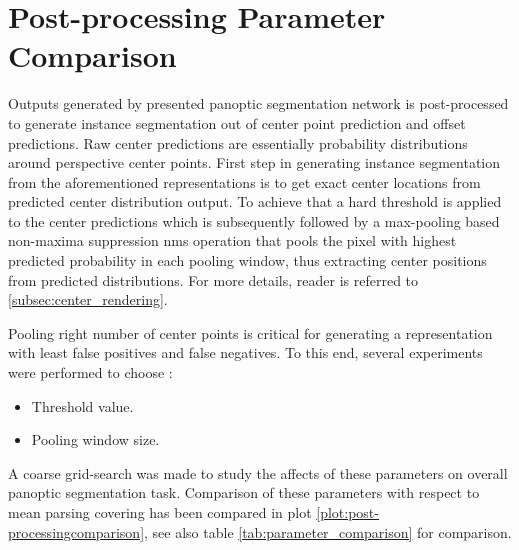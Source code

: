 \section{Post-processing Parameter Comparison}
\label{subsec:post-processingparameters}

Outputs generated by presented panoptic segmentation network is post-processed to generate instance segmentation out of center point prediction and offset predictions. Raw center predictions are essentially probability distributions around perspective center points. First step in generating instance segmentation from the aforementioned representations is to get exact center locations from predicted center distribution output. To achieve that a hard threshold is applied to the center predictions which is subsequently followed by a max-pooling based non-maxima suppression \gls{nms} operation that pools the pixel with highest predicted probability in each pooling window, thus extracting center positions from predicted distributions. For more details, reader is referred to \ref{subsec:center_rendering}.

Pooling right number of center points is critical for generating a representation with least false positives and false negatives. To this end, several experiments were performed to choose :

\begin{itemize}
    \item  Threshold value.
    \item  Pooling window size.
\end{itemize}

A coarse grid-search was made to study the affects of these parameters on overall panoptic segmentation task. Comparison of these parameters with respect to mean parsing covering has been compared in plot \ref{plot:post-processingcomparison}, see also table \ref{tab:parameter_comparison} for comparison.

